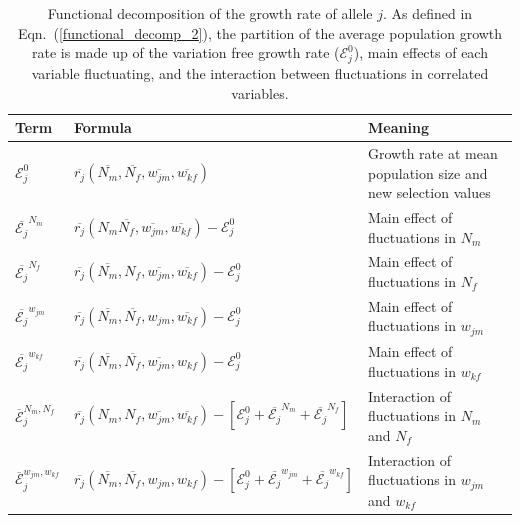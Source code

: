 \documentclass[12pt]{article}
\begin{document}
\begin{table}[h]
\fontsize{7}{12}\selectfont %
    \centering
      \caption{Functional decomposition of the growth rate of allele $j$. As defined in Eqn.~(\ref{functional_decomp_2}), the partition of the average population growth rate is made up of the variation free growth rate ($\mathcal{E}^{0}_{j}$), main effects of each variable fluctuating, and the interaction between fluctuations in correlated variables. }
  \resizebox{\textwidth}{!} {\begin{tabular}{l|l|l}
  \toprule
        Term & Formula & Meaning \\
        \hline
         $\mathcal{E}^{0}_{j}$ & $\overline{r_{j}} (\overline{N_{m}}, \overline{N_{f}}, \overline{w_{jm}}, \overline{w_{kf}})$ & Growth rate at mean population size and new selection values \\


         $\overline{\mathcal{E}_{j}}^{N_{m}}$ & $\overline{r_{j}}(N_{m} \overline{N_{f}}, \overline{w_{jm}}, \overline{w_{kf}}) - \mathcal{E}^{0}_{j} $ & Main effect of fluctuations in $N_{m}$\\

         $\overline{\mathcal{E}_{j}}^{N_{f}}$ & $ \overline{r_{j}}( \overline{N_{m}}, N_{f},\overline{w_{jm}}, \overline{w_{kf}}) - \mathcal{E}^{0}_{j}$ & Main effect of fluctuations in $N_{f}$ \\

        $\overline{\mathcal{E}_{j}}^{w_{jm}}$ & $ \overline{r_{j}}(\overline{N_{m}}, \overline{N_{f}}, w_{jm}, \overline{w_{kf}}) - \mathcal{E}^{0}_{j}$& Main effect of fluctuations in $w_{jm}$\\

        $\overline{\mathcal{E}_{j}}^{w_{kf}}$ & $ \overline{r_{j}}(\overline{N_{m}}, \overline{N_{f}}, \overline{w_{jm}}, w_{kf})- \mathcal{E}^{0}_{j}$ & Main effect of fluctuations in $w_{kf}$\\

        $\overline{\mathcal{E}}^{N_{m},N_{f}}_{j}$ & $ \overline{r_{j}}(N_{m}, N_{f}, \overline{w_{jm}}, \overline{w_{kf}})- [\mathcal{E}^{0}_{j} +\overline{\mathcal{E}_{j}}^{N_{m}}+\overline{\mathcal{E}_{j}}^{N_{f}}]$ & Interaction of fluctuations in $N_{m}$ and $N_{f}$\\

        $\overline{\mathcal{E}}^{w_{jm},w_{kf}}_{j}$ & $ \overline{r_{j}}(\overline{N_{m}}, \overline{N_{f}}, w_{jm}, w_{kf})- [\mathcal{E}^{0}_{j} +\overline{\mathcal{E}_{j}}^{w_{jm}}+\overline{\mathcal{E}_{j}}^{w_{kf}}]$ & Interaction of fluctuations in $w_{jm}$ and $w_{kf}$ \\


\end{tabular}}
\end{table}
\end{document}
